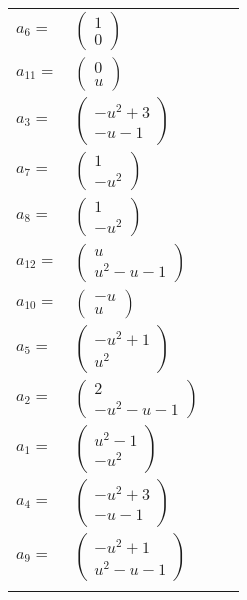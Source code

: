 \documentclass[1p]{elsarticle_modified}
\theoremstyle{definition}
\begin{document}
\begin{tabular}{m{7pt} m{180pt} m{7pt} m{180pt} }
\flushright $a_{6}=$&$\begin{pmatrix}1\\0\end{pmatrix}$ \\
\flushright $a_{11}=$&$\begin{pmatrix}0\\u\end{pmatrix}$ \\
\flushright $a_{3}=$&$\begin{pmatrix}- u^2+3\\- u-1\end{pmatrix}$ \\
\flushright $a_{7}=$&$\begin{pmatrix}1\\- u^2\end{pmatrix}$ \\
\flushright $a_{8}=$&$\begin{pmatrix}1\\- u^2\end{pmatrix}$ \\
\flushright $a_{12}=$&$\begin{pmatrix}u\\u^2- u-1\end{pmatrix}$ \\
\flushright $a_{10}=$&$\begin{pmatrix}- u\\u\end{pmatrix}$ \\
\flushright $a_{5}=$&$\begin{pmatrix}- u^2+1\\u^2\end{pmatrix}$ \\
\flushright $a_{2}=$&$\begin{pmatrix}2\\- u^2- u-1\end{pmatrix}$ \\
\flushright $a_{1}=$&$\begin{pmatrix}u^2-1\\- u^2\end{pmatrix}$ \\
\flushright $a_{4}=$&$\begin{pmatrix}- u^2+3\\- u-1\end{pmatrix}$ \\
\flushright $a_{9}=$&$\begin{pmatrix}- u^2+1\\u^2- u-1\end{pmatrix}$\\&\end{tabular}
\end{document}
